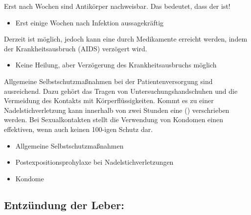 {%
Erst nach  Wochen sind Antikörper nachweisbar.
Das bedeutet, dass der  ist!
}
{%
\begin{itemize}
  \item Erst einige Wochen nach Infektion aussagekräftig
\end{itemize}
}
{}
{}
{}

{%
Derzeit ist  möglich, jedoch
  kann eine  durch
  Medikamente erreicht werden, indem der Krankheitsausbruch
  (AIDS) verzögert wird.

}
{
\begin{itemize}
  \item Keine Heilung, aber Verzögerung des
  Krankheitsausbruchs möglich
\end{itemize}
}
{}
{}
{}

{%
Allgemeine Selbstschutzmaßnahmen bei der
Patientenversorgung sind ausreichend. Dazu gehört das
Tragen von Untersuchungshandschuhen und die Vermeidung
des Kontakts mit Körperflüssigkeiten. Kommt es zu einer
Nadelstichverletzung kann innerhalb von zwei Stunden eine
 () verschrieben werden.
Bei Sexualkontakten stellt die Verwendung von Kondomen einen
effektiven, wenn auch keinen 100\PC*-igen Schutz dar.

}
{
\begin{itemize}
  \item Allgemeine Selbstschutzmaßnahmen 
  \item Postexpositionsprohylaxe bei Nadelstichverletzungen
  \item Kondome
\end{itemize}
}
{}
{}
{}



\clearpage
\subsection{Entzündung der Leber: }
\label{topic:hepatitis-virale}%
\label{topic:hepatitis-toxisch}%
\label{topic:hepatitis}%
%
%





